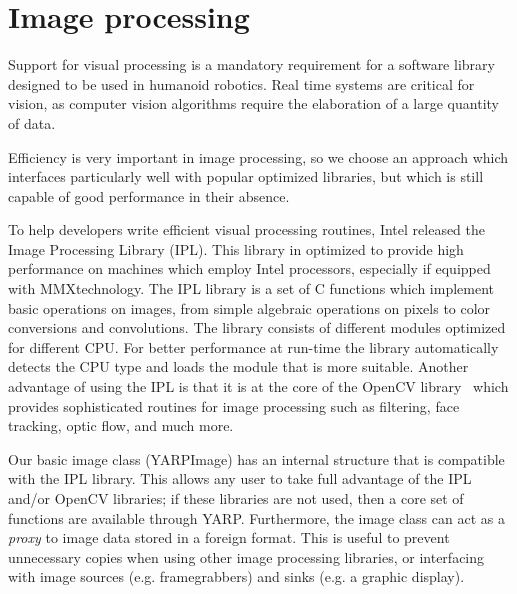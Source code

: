 \section{Image processing}

Support for visual processing is a mandatory requirement for a
software library designed to be used in humanoid robotics. Real time
systems are critical for vision, as computer vision algorithms require
the elaboration of a large quantity of data.

Efficiency is very important in image processing, so we choose
an approach which interfaces particularly well with popular
optimized libraries, but which is still capable of good
performance in their absence.

To help developers write efficient visual processing routines, Intel
released the Image Processing Library (IPL). This library in optimized
to provide high performance on machines which employ Intel processors,
especially if equipped with MMX\texttrademark technology. The IPL
library is a set of C functions which implement basic operations on
images, from simple algebraic operations on pixels to color
conversions and convolutions. The library consists of different
modules optimized for different CPU. For better performance at
run-time the library automatically detects the CPU type and loads the
module that is more suitable. Another advantage of using the IPL is
that it is at the core of the OpenCV library~\cite{bradski04open}
which provides 
sophisticated routines for image processing such as filtering, face
tracking, optic flow, and much more.

Our basic image class (YARPImage) has an internal structure that is
compatible with the IPL library.  This allows any user to take full
advantage of the IPL and/or OpenCV libraries; if these libraries
are not used, then a core set of functions are available through
YARP.  Furthermore, the image class can act as a {\em proxy} to image
data stored in a foreign format.  This is useful to prevent unnecessary
copies when using other image processing libraries, or interfacing
with image sources (e.g. framegrabbers) and sinks (e.g. a graphic
display).




